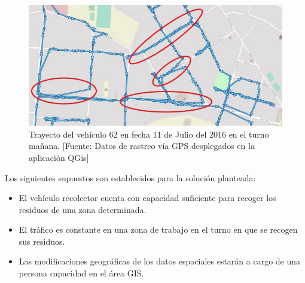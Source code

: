 \begin{figure}[H]
    \centering
    \includegraphics[width=14.5cm]{20170329_recorrido_repetido.png}
    \caption{Trayecto del vehículo 62 en fecha 11 de Julio del 2016 en el turno mañana. [Fuente: Datos de rastreo vía GPS desplegados en la aplicación QGis]}
    \label{fig:trayectoRecoleccion}
\end{figure}

Los siguientes supuestos son establecidos para la solución planteada:

\begin{itemize}
    \item El vehículo recolector cuenta con capacidad suficiente para recoger los residuos de una zona determinada.
    \item El tráfico es constante en una zona de trabajo en el turno en que se recogen sus residuos.
    \item Las modificaciones geográficas de los datos espaciales estarán a cargo de una persona capacidad en el área GIS.
\end{itemize}



